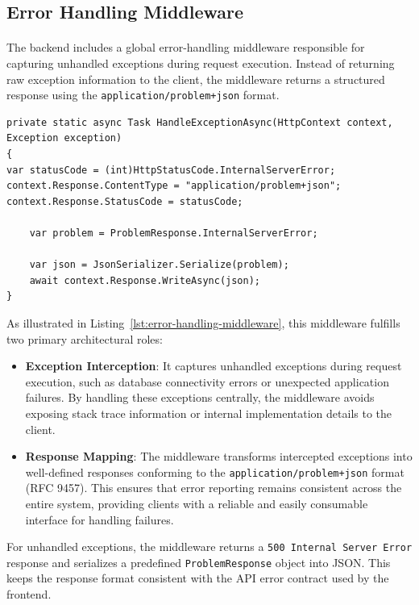 \subsection{Error Handling Middleware}

\paragraph{}The backend includes a global error-handling middleware responsible for capturing unhandled exceptions during request execution. Instead of returning raw exception information to the client, the middleware returns a structured response using the \texttt{application/problem+json} format.

\begin{lstlisting}[caption={Error Handling Middleware Implementation}, label={lst:error-handling-middleware}]
private static async Task HandleExceptionAsync(HttpContext context, Exception exception)
{
var statusCode = (int)HttpStatusCode.InternalServerError;
context.Response.ContentType = "application/problem+json";
context.Response.StatusCode = statusCode;

    var problem = ProblemResponse.InternalServerError;

    var json = JsonSerializer.Serialize(problem);
    await context.Response.WriteAsync(json);
}
\end{lstlisting}

As illustrated in Listing~\ref{lst:error-handling-middleware}, this middleware fulfills two primary architectural roles:

\begin{itemize}
\item \textbf{Exception Interception}: It captures unhandled exceptions during request execution, such as database connectivity errors or unexpected application failures. By handling these exceptions centrally, the middleware avoids exposing stack trace information or internal implementation details to the client.

\item \textbf{Response Mapping}: The middleware transforms intercepted exceptions into well-defined responses conforming to the \texttt{application/problem+json} format (RFC 9457). This ensures that error reporting remains consistent across the entire system, providing clients with a reliable and easily consumable interface for handling failures.
\end{itemize}

For unhandled exceptions, the middleware returns a \texttt{500 Internal Server Error} response and serializes a predefined \texttt{ProblemResponse} object into JSON. This keeps the response format consistent with the API error contract used by the frontend.


